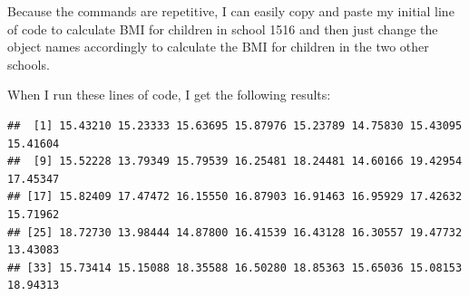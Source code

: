 \documentclass[
  12pt,
]{book}
\newenvironment{Shaded}{\begin{snugshade}}{\end{snugshade}}
\newcommand{\DecValTok}[1]{\textcolor[rgb]{0.00,0.00,0.81}{#1}}
\newcommand{\DocumentationTok}[1]{\textcolor[rgb]{0.56,0.35,0.01}{\textbf{\textit{#1}}}}
\newcommand{\NormalTok}[1]{#1}
\newcommand{\SpecialCharTok}[1]{\textcolor[rgb]{0.00,0.00,0.00}{#1}}
\begin{document}
\begin{Shaded}
\end{Shaded}

Because the commands are repetitive, I can easily copy and paste my initial line of code to calculate BMI for children in school 1516 and then just change the object names accordingly to calculate the BMI for children in the two other schools.

When I run these lines of code, I get the following results:

\begin{Shaded}
\end{Shaded}

\begin{verbatim}
##  [1] 15.43210 15.23333 15.63695 15.87976 15.23789 14.75830 15.43095 15.41604
##  [9] 15.52228 13.79349 15.79539 16.25481 18.24481 14.60166 19.42954 17.45347
## [17] 15.82409 17.47472 16.15550 16.87903 16.91463 16.95929 17.42632 15.71962
## [25] 18.72730 13.98444 14.87800 16.41539 16.43128 16.30557 19.47732 13.43083
## [33] 15.73414 15.15088 18.35588 16.50280 18.85363 15.65036 15.08153 18.94313
\end{verbatim}
\end{document}
